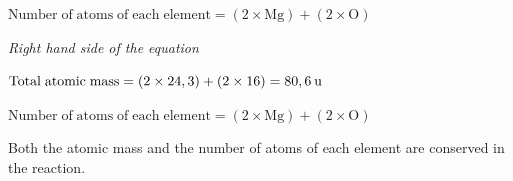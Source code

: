       \label{m38711*id64761}$\mathrm{Number\; of\; atoms\; of\; each\; element}=\left(2\ensuremath{\times}\mathrm{Mg}\right)+\left(2\ensuremath{\times}\mathrm{O}\right)$\par 
      \label{m38711*id64783}
        \textsl{Right hand side of the equation}
      \par 
      \label{m38711*id64790}$\mathrm{Total\; atomic\; mass}=\left(2\ensuremath{\times}24,3\right)+\left(2\ensuremath{\times}16\right)=80,6\phantom{\rule{2pt}{0ex}}\mathrm{u}$\par 
      \label{m38711*id64811}$\mathrm{Number\; of\; atoms\; of\; each\; element}=\left(2\ensuremath{\times}\mathrm{Mg}\right)+\left(2\ensuremath{\times}\mathrm{O}\right)$\par 
      \label{m38711*id64833}Both the atomic mass and the number of atoms of each element are conserved in the reaction.\par 
\label{m38711*secfhsst!!!underscore!!!id486}
